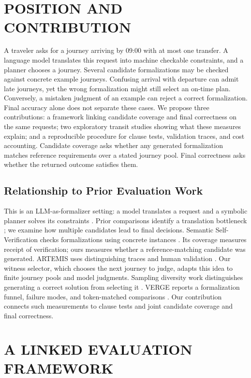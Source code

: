 \documentclass[a4paper,twoside]{article}
\begin{document}
\section{\uppercase{Position and Contribution}}
\label{sec:position}
\noindent A traveler asks for a journey arriving by 09:00 with at most one transfer. A language model translates this request into machine checkable constraints, and a planner chooses a journey. Several candidate formalizations may be checked against concrete example journeys. Confusing arrival with departure can admit late journeys, yet the wrong formalization might still select an on-time plan. Conversely, a mistaken judgment of an example can reject a correct formalization. Final accuracy alone does not separate these cases.
We propose three contributions: a framework linking candidate coverage and final correctness on the same requests; two exploratory transit studies showing what these measures explain; and a reproducible procedure for clause tests, validation traces, and cost accounting. Candidate coverage asks whether any generated formalization matches reference requirements over a stated journey pool. Final correctness asks whether the returned outcome satisfies them.

\subsection{Relationship to Prior Evaluation Work}

This is an LLM-as-formalizer setting: a model translates a request and a symbolic planner solves its constraints \cite{tantakoun}. Prior comparisons identify a translation bottleneck \cite{amonkar}; we examine how multiple candidates lead to final decisions.
Semantic Self-Verification checks formalizations using concrete instances \cite{ssv}. Its coverage measures receipt of verification; ours measures whether a reference-matching candidate was generated.
ARTEMIS uses distinguishing traces and human validation \cite{artemis}. Our witness selector, which chooses the next journey to judge, adapts this idea to finite journey pools and model judgments.
Sampling diversity work distinguishes generating a correct solution from selecting it \cite{diversity}. VERGE reports a formalization funnel, failure modes, and token-matched comparisons \cite{verge}. Our contribution connects such measurements to clause tests and joint candidate coverage and final correctness.

\section{\uppercase{A Linked Evaluation Framework}}
\label{sec:framework}
\end{document}
